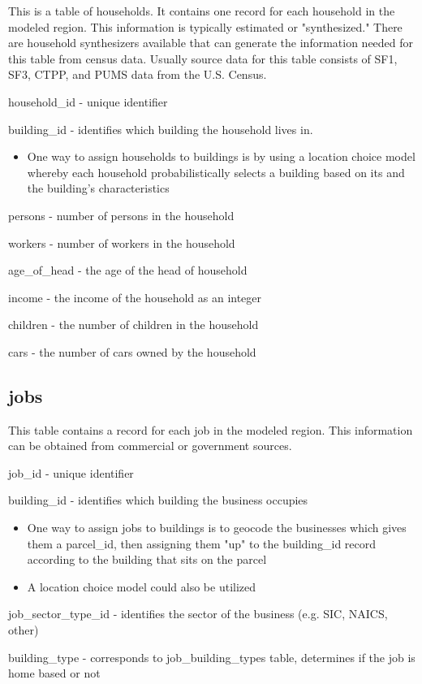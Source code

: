 This is a table of households. It contains one record for each household in the modeled region. This information is typically estimated or "synthesized." There are household synthesizers available that can generate the information needed for this table from census data. Usually source data for this table consists of SF1, SF3, CTPP, and PUMS data from the U.S. Census.

\begin{description}
\item household\_id - unique identifier
\item building\_id - identifies which building the household lives in.
  \begin{itemize}
  \item One way to assign households to buildings is by using a location choice model whereby each household 
      probabilistically selects a building based on its and the building's characteristics
   \end{itemize}
\item persons - number of persons in the household
\item workers - number of workers in the household
\item age\_of\_head - the age of the head of household
\item income - the income of the household as an integer
\item children - the number of children in the household
\item cars - the number of cars owned by the household 
\end{description}

\subsection{jobs} 

This table contains a record for each job in the modeled region. This information can be obtained from commercial or government sources.

\begin{description}
\item job\_id - unique identifier
\item building\_id - identifies which building the business occupies
  \begin{itemize}
  \item One way to assign jobs to buildings is to geocode the businesses which gives them a parcel\_id, then assigning them "up" to the building\_id record according to the building that sits on the parcel
  \item A location choice model could also be utilized 
  \end{itemize}
\item job\_sector\_type\_id - identifies the sector of the business (e.g. SIC, NAICS, other)
\item building\_type - corresponds to job\_building\_types table, determines if the job is home based or not 
\end{description}

